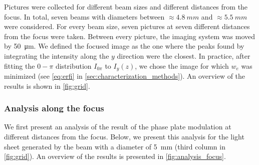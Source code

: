 Pictures were collected for different beam sizes and different distances from the focus. In total, seven beams with diameters between $\approx\SI{4.8}{mm}$ and $\approx\SI{5.5}{mm}$ were considered. For every beam size, seven pictures at seven different distances from the focus were taken. Between every picture, the imaging system was moved by \SI{50}{\micro m}. We defined the focused image as the one where the peaks found by integrating the intensity along the $y$ direction were the closest. In practice, after fitting the $0-\pi$ distribution $I_{0\pi}$ to $I_y(z)$, we chose the image for which $w_e$ was minimized (see \cref{eq:erfi} in \cref{sec:characterization_methods}). An overview of the results is shown in \cref{fig:grid}.

\subsubsection{Analysis along the focus}
We first present an analysis of the result of the phase plate modulation at different distances from the focus. Below, we present this analysis for the light sheet generated by the beam with a diameter of \SI{5}{mm} (third column in \cref{fig:grid}). An overview of the results is presented in \cref{fig:analysis_focus}.

